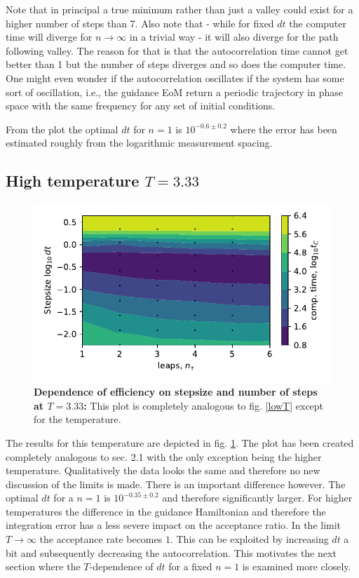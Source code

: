 \documentclass[11pt, a4paper]{scrartcl}
\begin{document}
    Note that in principal a true minimum rather than just a valley could exist for a higher number of steps than 7. Also note that - while for fixed $dt$ the computer time will diverge for $n \rightarrow \infty$ in a trivial way - it will also diverge for the path following valley. The reason for that is that the autocorrelation time cannot get better than 1 but the number of steps diverges and so does the computer time. One might even wonder if the autocorrelation oscillates if the system has some sort of oscillation, i.e., the guidance EoM return a periodic trajectory in phase space with the same frequency for any set of initial conditions.

    From the plot the optimal $dt$ for $n = 1$ is $10^{-0.6 \pm 0.2}$ where the error has been estimated roughly from the logarithmic measurement spacing.

\subsection{High temperature $T = 3.33$}
    \begin{figure}
    \begin{centering}
        \includegraphics{high_T.pdf}
        \caption{\textbf{Dependence of efficiency on stepsize and number of steps at $T = 3.33$: } This plot is completely analogous to fig. \ref{lowT} except for the temperature.}
    \end{centering}
    \label{highT}
    \end{figure}
    The results for this temperature are depicted in fig. \ref{highT}. The plot has been created completely analogous to sec. 2.1 with the only exception being the higher temperature. Qualitatively the data looks the same and therefore no new discussion of the limits is made. There is an important difference however. The optimal $dt$ for a $n = 1$ is $10^{-0.35 \pm 0.2}$ and therefore significantly larger. For higher temperatures the difference in the guidance Hamiltonian and therefore the integration error has a less severe impact on the acceptance ratio. In the limit $T \rightarrow \infty$ the acceptance rate becomes $1$. This can be exploited by increasing $dt$ a bit and subsequently decreasing the autocorrelation. This motivates the next section where the $T$-dependence of $dt$ for a fixed $n = 1$ is examined more closely.
\end{document}
